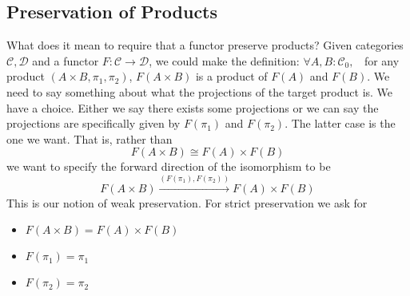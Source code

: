 \documentclass[12pt]{article}
\theoremstyle{definition}
\newcommand{\cat}{\mathcal}
\begin{document}
\subsection{Preservation of Products}
What does it mean to require that a functor preserve products?
Given categories $\cat C, \cat D$ and a functor $F : \cat C \to \cat D$, we could make the definition:
    $\forall A, B : \cat C_0, \;\;$ for any product $(A \times B, \pi_1, \pi_2)$, $F(A\times B)$ is a product of $F(A)$ and $F(B)$. We need to say something about what the projections of the target product is. We have a choice. Either we say there exists some projections or we can say the projections are specifically given by $F(\pi_1)$ and $F(\pi_2)$. The latter case is the one we want. That is, rather than 
    \[
     F(A \times B) \cong F(A) \times F(B)    
    \]
    we want to specify the forward direction of the isomorphism to be 
    \[
      F(A \times B) \xrightarrow{(F(\pi_1),F(\pi_2))} F(A) \times F(B)
    \]
This is our notion of weak preservation. For strict preservation we ask for 
\begin{itemize}
    \item $F(A\times B) = F(A)\times F(B)$
    \item $F(\pi_1) = \pi_1 $
    \item $F(\pi_2) = \pi_2$
\end{itemize}
\end{document}
